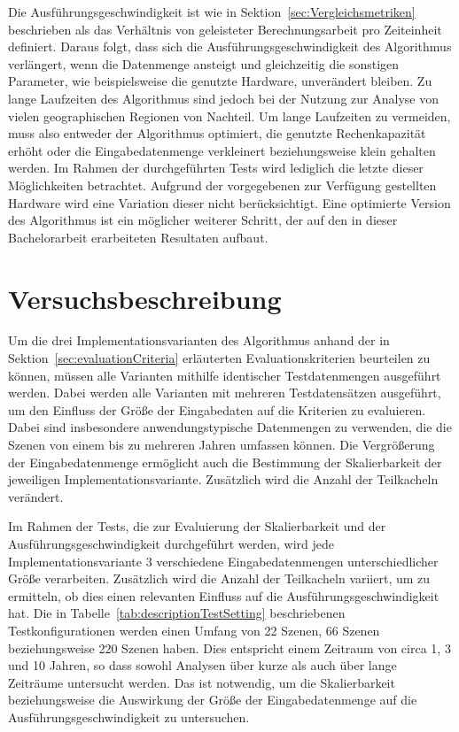 Die Ausführungsgeschwindigkeit ist wie in Sektion~\ref{sec:Vergleichsmetriken} beschrieben als das Verhältnis von geleisteter Berechnungsarbeit pro Zeiteinheit definiert. Daraus folgt, dass sich die Ausführungsgeschwindigkeit des Algorithmus verlängert, wenn die Datenmenge ansteigt und gleichzeitig die sonstigen Parameter, wie beispielsweise die genutzte Hardware, unverändert bleiben. Zu lange Laufzeiten des Algorithmus sind jedoch bei der Nutzung zur Analyse von vielen geographischen Regionen von Nachteil. Um lange Laufzeiten zu vermeiden, muss also entweder der Algorithmus optimiert, die genutzte Rechenkapazität erhöht oder die Eingabedatenmenge verkleinert beziehungsweise klein gehalten werden. Im Rahmen der durchgeführten Tests wird lediglich die letzte dieser Möglichkeiten betrachtet. Aufgrund der vorgegebenen zur Verfügung gestellten Hardware wird eine Variation dieser nicht berücksichtigt. Eine optimierte Version des Algorithmus ist ein möglicher weiterer Schritt, der auf den in dieser Bachelorarbeit erarbeiteten Resultaten aufbaut. 

\section{Versuchsbeschreibung}
Um die drei Implementationsvarianten des Algorithmus anhand der in Sektion~\ref{sec:evaluationCriteria} erläuterten Evaluationskriterien beurteilen zu können, müssen alle Varianten mithilfe identischer Testdatenmengen ausgeführt werden. Dabei werden alle Varianten mit mehreren Testdatensätzen ausgeführt, um den Einfluss der Größe der Eingabedaten auf die Kriterien zu evaluieren. Dabei sind insbesondere anwendungstypische Datenmengen zu verwenden, die die Szenen von einem bis zu mehreren Jahren umfassen können. Die Vergrößerung der Eingabedatenmenge ermöglicht auch die Bestimmung der Skalierbarkeit der jeweiligen Implementationsvariante.
Zusätzlich wird die Anzahl der Teilkacheln verändert. 

Im Rahmen der Tests, die zur Evaluierung der Skalierbarkeit und der Ausführungsgeschwindigkeit durchgeführt werden, wird jede Implementationsvariante 3 verschiedene Eingabedatenmengen unterschiedlicher Größe verarbeiten. Zusätzlich wird die Anzahl der Teilkacheln variiert, um zu ermitteln, ob dies einen relevanten Einfluss auf die Ausführungsgeschwindigkeit hat. Die in Tabelle~\ref{tab:descriptionTestSetting} beschriebenen Testkonfigurationen werden einen Umfang von 22 Szenen, 66 Szenen beziehungsweise 220 Szenen haben. Dies entspricht einem Zeitraum von circa 1, 3 und 10 Jahren, so dass sowohl Analysen über kurze als auch über lange Zeiträume untersucht werden. Das ist notwendig, um die Skalierbarkeit beziehungsweise die Auswirkung der Größe der Eingabedatenmenge auf die Ausführungsgeschwindigkeit zu untersuchen.

